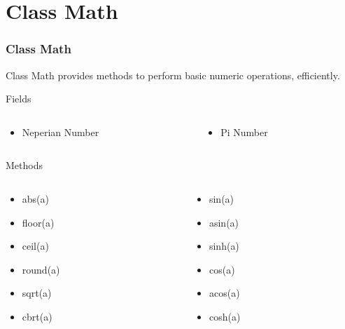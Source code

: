 \documentclass[10pt, compress]{beamer}
\begin{document}
\section{Class Math}

\begin{frame}[fragile]
	\frametitle{Class Math}
	Class Math provides methods to perform basic numeric operations, efficiently.
	\begin{block}{Fields}
		\begin{columns}
			\begin{column}{0.5\textwidth}
				\begin{itemize}
					\item[] Neperian Number
				\end{itemize}
			\end{column}
			\begin{column}{0.5\textwidth}
				\begin{itemize}
					\item[] Pi Number
				\end{itemize}
			\end{column}
		\end{columns}
	\end{block}
	\begin{block}{Methods}
		\begin{columns}
			\begin{column}{0.5\textwidth}
				\begin{itemize}
					\item[] abs(a)
					\item[] floor(a)
					\item[] ceil(a)
					\item[] round(a)
					\item[] sqrt(a)
					\item[] cbrt(a)
				\end{itemize}
			\end{column}
			\begin{column}{0.5\textwidth}
				\begin{itemize}
					\item[] sin(a)
					\item[] asin(a)
					\item[] sinh(a)
					\item[] cos(a)
					\item[] acos(a)
					\item[] cosh(a)
				\end{itemize}
			\end{column}
		\end{columns}
	\end{block}
\end{frame}
\end{document}
